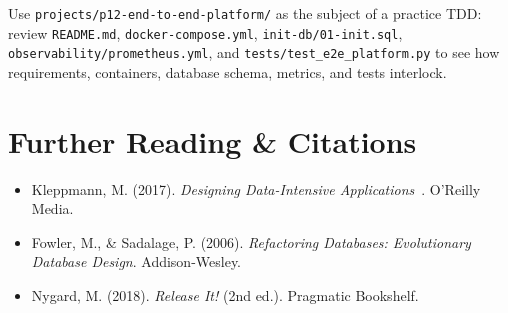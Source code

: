 \begin{labbridgebox}
Use \texttt{projects/p12-end-to-end-platform/} as the subject of a practice TDD: review \texttt{README.md}, \texttt{docker-compose.yml}, \texttt{init-db/01-init.sql}, \texttt{observability/prometheus.yml}, and \texttt{tests/test\_e2e\_platform.py} to see how requirements, containers, database schema, metrics, and tests interlock.
\end{labbridgebox}

\section{Further Reading \protect\& Citations}
\begin{itemize}[leftmargin=18pt]
  \item Kleppmann, M. (2017). \textit{Designing Data-Intensive Applications}~\cite{kleppmann2017designing}. O'Reilly Media.
  \item Fowler, M., \& Sadalage, P. (2006). \textit{Refactoring Databases: Evolutionary Database Design}. Addison-Wesley.
  \item Nygard, M. (2018). \textit{Release It!} (2nd ed.). Pragmatic Bookshelf.
\end{itemize}
